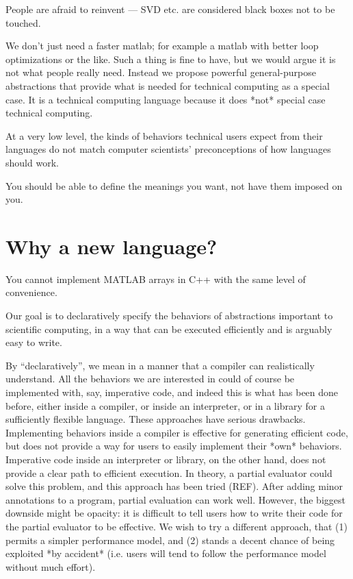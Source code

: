 People are afraid to reinvent --- SVD etc. are considered black
boxes not to be touched.

We don't just need a faster matlab; for example a matlab with better
loop optimizations or the like. Such a thing is fine to have,
but we would argue it is not what people really need.
Instead we propose powerful general-purpose abstractions that
provide what is needed for technical computing as a special case.
It is a technical computing language because it does *not*
special case technical computing.


At a very low level, the kinds of behaviors technical users expect
from their languages do not match computer scientists' preconceptions
of how languages should work.

You should be able to define the meanings you want, not have them
imposed on you.


\section{Why a new language?}

You cannot implement MATLAB arrays in C++ with the same level of
convenience.


Our goal is to declaratively specify the behaviors of abstractions
important to scientific computing, in a way that can be executed
efficiently and is arguably easy to write.

By ``declaratively'', we mean in a manner that a compiler can
realistically understand. All the behaviors we are interested in
could of course be implemented with, say, imperative code, and indeed
this is what has been done before, either inside a compiler, or inside
an interpreter, or in a library for a sufficiently flexible language.
These approaches have serious drawbacks. Implementing behaviors
inside a compiler is effective for generating efficient code, but
does not provide a way for users to easily implement their *own*
behaviors. Imperative code inside an interpreter or library, on the other hand,
does not provide a clear path to efficient execution. In theory, a
partial evaluator could solve this problem, and this approach has been
tried (REF). After adding minor annotations to a program, partial evaluation
can work well. However, the biggest downside might be opacity: it is
difficult to tell users how to write their code for the partial
evaluator to be effective. We wish to try a different approach, that
(1) permits a simpler performance model, and (2) stands a decent chance
of being exploited *by accident* (i.e. users will tend to follow the performance
model without much effort).


